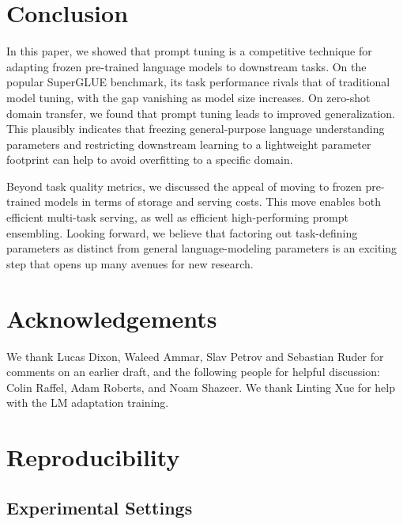\documentclass[11pt]{article}
\begin{document}
\section{Conclusion}

In this paper, we showed that prompt tuning is a competitive technique for adapting frozen pre-trained language models to downstream tasks. On the popular SuperGLUE benchmark, its task performance rivals that of traditional model tuning, with the gap vanishing as model size increases. On zero-shot domain transfer, we found that prompt tuning leads to improved generalization. This plausibly indicates that freezing general-purpose language understanding parameters and restricting downstream learning to a lightweight parameter footprint can help to avoid overfitting to a specific domain.

Beyond task quality metrics, we discussed the appeal of moving to frozen pre-trained models in terms of storage and serving costs. This move enables both efficient multi-task serving, as well as efficient high-performing prompt ensembling. Looking forward, we believe that factoring out task-defining parameters as distinct from general language-modeling parameters is an exciting step that opens up many avenues for new research.

\section*{Acknowledgements}

We thank Lucas Dixon, Waleed Ammar, Slav Petrov and Sebastian Ruder for comments on an earlier draft, and the following people for helpful discussion: Colin Raffel, Adam Roberts, and Noam Shazeer. We thank Linting Xue for help with the LM adaptation training.




\clearpage

\appendix

\section{Reproducibility}
\label{app:reproducibility}

\subsection{Experimental Settings}
\end{document}
